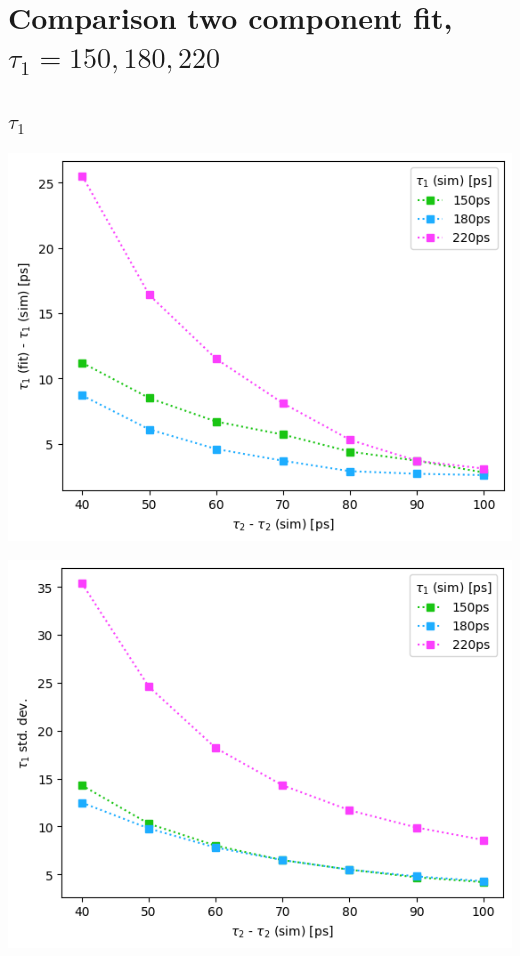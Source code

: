 \section{\boldmath Comparison two component fit, $\tau_1 = 150,180,220$ \unboldmath \label{comp-t1}}

\subsection*{\LARGE\centering\boldmath$\tau_1$\unboldmath}

\begin{minipage}{.47\linewidth}
    \centering
    \includegraphics[width=\linewidth]{Batch 3/regular IRF/t1-diff 2080.png}
    \label{fig:comp-t1-2080}
\end{minipage}
\hfill
\begin{minipage}{.47\linewidth}
    \centering
    \includegraphics[width=\linewidth]{Batch 3/regular IRF/t1-err 2080.png}
    \label{fig:comp-t1err-2080}
\end{minipage}
